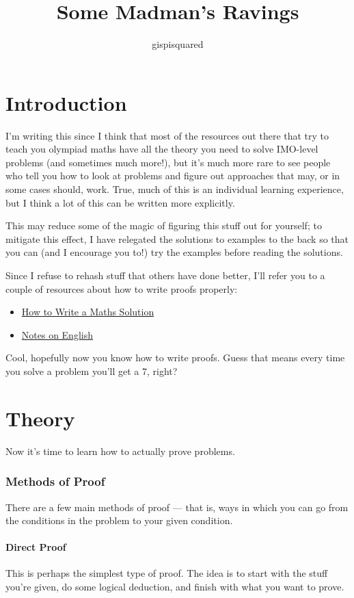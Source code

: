 \documentclass{amsart}
\title{Some Madman's Ravings}
\author{gispisquared}
\begin{document}
\maketitle
\tableofcontents
\part{Introduction}
I'm writing this since I think that most of the resources out there that try to
teach you olympiad maths have all the theory you need to solve IMO-level
problems (and sometimes much more!), but it's much more rare to see people who
tell you how to look at problems and figure out approaches that may, or in some
cases should, work. True, much of this is an individual learning experience, but
I think a lot of this can be written more explicitly.

This may reduce some of the magic of figuring this stuff out for yourself; to
mitigate this effect, I have relegated the solutions to examples to the back so
that you can (and I encourage you to!) try the examples before reading the
solutions.

Since I refuse to rehash stuff that others have done better, I'll refer you to a
couple of resources about how to write proofs properly:
\begin{itemize}
  \item
    \href{https://artofproblemsolving.com/news/articles/how-to-write-a-solution}
    {How to Write a Maths Solution}
  \item \href{https://web.evanchen.cc/handouts/english/english.pdf}{Notes on
    English}
\end{itemize}

Cool, hopefully now you know how to write proofs. Guess that means every time
you solve a problem you'll get a 7, right?

\part{Theory}
Now it's time to learn how to actually prove problems.
\section{Methods of Proof}
There are a few main methods of proof --- that is, ways in which you can go from
the conditions in the problem to your given condition.

\subsection{Direct Proof}
This is perhaps the simplest type of proof. The idea is to start with the stuff
you're given, do some logical deduction, and finish with what you want to prove.
\end{document}
